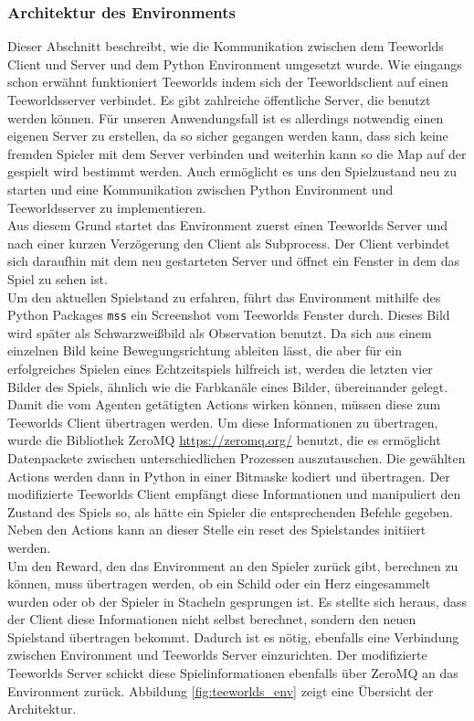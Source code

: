 \documentclass[11pt]{scrartcl}
\begin{document}
\subsubsection{Architektur des Environments}
Dieser Abschnitt beschreibt, wie die Kommunikation zwischen dem Teeworlds Client und
Server und dem Python Environment umgesetzt wurde. Wie eingangs schon erwähnt funktioniert
Teeworlds indem sich der Teeworldsclient auf einen Teeworldsserver verbindet. Es gibt
zahlreiche öffentliche Server, die benutzt werden können. Für unseren Anwendungsfall ist
es allerdings notwendig einen eigenen Server zu erstellen, da so sicher gegangen werden
kann, dass sich keine fremden Spieler mit dem Server verbinden und weiterhin kann so die
Map auf der gespielt wird bestimmt werden. Auch ermöglicht es uns den Spielzustand neu zu
starten und eine Kommunikation zwischen Python Environment und Teeworldsserver zu
implementieren.\\
Aus diesem Grund startet das Environment zuerst einen Teeworlds Server und nach einer
kurzen Verzögerung den Client als Subprocess. Der Client verbindet sich daraufhin mit dem
neu gestarteten Server und öffnet ein Fenster in dem das Spiel zu sehen ist.\\
Um den aktuellen Spielstand zu erfahren, führt das Environment mithilfe des Python
Packages \lstinline!mss! ein Screenshot vom Teeworlds Fenster durch. Dieses Bild wird
später als Schwarzweißbild als Observation benutzt. Da sich aus einem einzelnen Bild
keine Bewegungsrichtung ableiten lässt, die aber für ein erfolgreiches Spielen eines
Echtzeitspiels hilfreich ist, werden die letzten vier Bilder des Spiels, ähnlich wie die
Farbkanäle eines Bilder, übereinander gelegt.\\
Damit die vom Agenten getätigten Actions wirken können, müssen diese zum Teeworlds Client
übertragen werden. Um diese Informationen zu übertragen, wurde die Bibliothek ZeroMQ
\url{https://zeromq.org/} benutzt, die es ermöglicht Datenpackete zwischen
unterschiedlichen Prozessen auszutauschen. Die gewählten Actions werden dann in Python
in einer Bitmaske kodiert und übertragen. Der modifizierte Teeworlds Client empfängt diese
Informationen und manipuliert den Zustand des Spiels so, als hätte ein Spieler die
entsprechenden Befehle gegeben. Neben den Actions kann an dieser Stelle ein reset des
Spielstandes initiiert werden.\\
Um den Reward, den das Environment an den Spieler zurück gibt, berechnen zu können, muss
übertragen werden, ob ein Schild oder ein Herz eingesammelt wurden oder ob der Spieler in
Stacheln gesprungen ist. Es stellte sich heraus, dass der Client diese Informationen nicht
selbst berechnet, sondern den neuen Spielstand übertragen bekommt. Dadurch ist es nötig,
ebenfalls eine Verbindung zwischen Environment und Teeworlds Server einzurichten. Der
modifizierte Teeworlds Server schickt diese Spielinformationen ebenfalls über ZeroMQ an
das Environment zurück. Abbildung \ref{fig:teeworlds_env} zeigt eine Übersicht der
Architektur.
\end{document}
